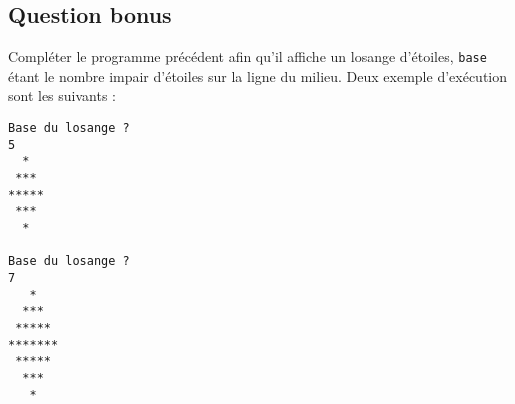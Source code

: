 \subsection*{Question bonus}

Compléter le programme précédent afin qu'il affiche un losange d'étoiles, \verb|base| étant le nombre impair d'étoiles sur la ligne du milieu. Deux exemple d'exécution sont les suivants :
\begin{small}
\begin{verbatim}
Base du losange ?
5
  *
 ***
*****
 ***
  *

Base du losange ?
7
   *
  ***
 *****
*******
 *****
  ***
   *
\end{verbatim}
\end{small}

